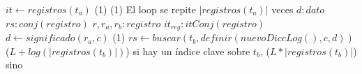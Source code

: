{    \State
    \State $it \gets registros(t_a)$                                    \comment \bigo(1)
                                              \comment \bigo(1)
        \State         \icomment El loop se repite $|registros(t_a)|$ veces
        \var $d : dato$
        \var $rs : conj(registro)$
        \var $r, r_a, r_b : registro$
        \var $it_{reg} : itConj(registro)$
        \State $d \gets significado(r_a, c)$                        \comment \bigo(1)
        \State $rs \gets buscar(t_b, definir(nuevoDiccLog(),c,d))$ 
        \State          \comment \bigo($L + log(|registros(t_b)|)$) si hay un índice clave sobre $t_b$,
                                                            \bigo($L * |registros(t_b)|$) sino
}{}
